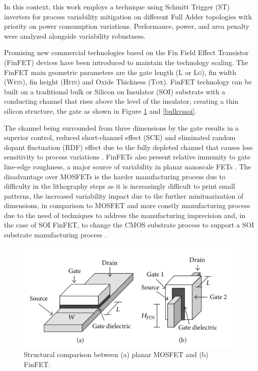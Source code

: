 \documentclass[ecp,tc, english]{iiufrgs}
\begin{document}
In this context, this work employs a technique using Schmitt Trigger (ST) inverters for process variability mitigation on different Full Adder topologies with priority on power consumption variations. Performance, power, and area penalty were analyzed alongside variability robustness. 

Promising new commercial technologies based on the Fin Field Effect Transistor (FinFET) devices have been introduced to maintain the technology scaling. The FinFET main geometric parameters are the gate length (L or L\textsc{g}), fin width (W\textsc{fin}), fin height (H\textsc{fin}) and Oxide Thickness (T\textsc{ox}). FinFET technology can be built on a traditional bulk or Silicon on Insulator (SOI) substrate with a conducting channel that rises above the level of the insulator, creating a thin silicon structure, the gate as shown in Figure \ref{mosfetvsfinfet} and \ref{bulkvssoi}. 

The channel being surrounded from three dimensions by the gate results in a superior control, reduced short-channel effect (SCE) and eliminated random dopant fluctuation (RDF) effect due to the fully depleted channel that causes less sensitivity to process variations \cite{taur2013fundamentals}. FinFETs also present relative immunity to gate line-edge roughness, a major source of variability in planar nanoscale FETs \cite{finfetchar1}. The disadvantage over MOSFETs is the harder manufacturing process due to difficulty in the lithography steps as it is increasingly difficult to print small patterns, the increased variability impact due to the further minituarization of dimensions, in comparison to MOSFET and more constly manufacturing process due to the need of techniques to address the manufacturing imprecision and, in the case of SOI FinFET, to change the CMOS substrate process to support a SOI substrate manufacturing process \cite{finfetchar1} \cite{finfetdis}.



\begin{figure}[H]
\centering
\includegraphics[width=\textwidth, trim={0 0cm 0 0cm},clip]{finfet.png}
\caption{Structural comparison between (a) planar MOSFET and (b) FinFET.}
\label{mosfetvsfinfet}
\end{figure}
\end{document}
